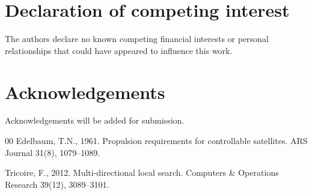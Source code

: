 \documentclass[review,12pt,authoryear]{elsarticle}
\begin{document}
\section*{Declaration of competing interest}
The authors declare no known competing financial interests or personal
relationships that could have appeared to influence this work.

\section*{Acknowledgements}
Acknowledgements will be added for submission.

\begin{thebibliography}{00}
Edelbaum, T.N., 1961. Propulsion requirements for controllable satellites.
ARS Journal 31(8), 1079--1089.

Tricoire, F., 2012. Multi-directional local search.
Computers \& Operations Research 39(12), 3089--3101.
\end{thebibliography}
\end{document}
